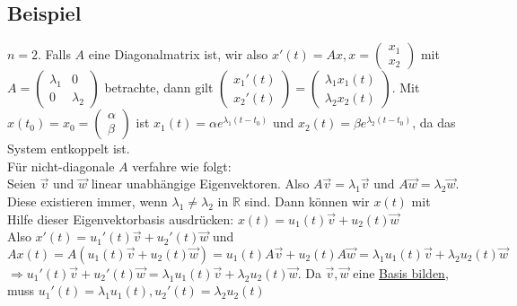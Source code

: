 \documentclass[12pt,a4paper]{article}
\begin{document}
\subsection{Beispiel}
$n=2$. Falls $A$ eine Diagonalmatrix ist, wir also $x'(t) = Ax, x=\begin{pmatrix}
x_1 \\
x_2
\end{pmatrix}$ mit $A=\begin{pmatrix}
\lambda_1 & 0 \\
0 & \lambda_2
\end{pmatrix}$ betrachte, dann gilt $\begin{pmatrix}
x_1'(t) \\
x_2'(t)
\end{pmatrix} = \begin{pmatrix}
\lambda_1x_1(t) \\
\lambda_2x_2(t)
\end{pmatrix}$. Mit $x(t_0) = x_0 = \begin{pmatrix}
\alpha \\
\beta
\end{pmatrix}$ ist $x_1(t) = \alpha e^{\lambda_1(t-t_0)}$ und $x_2(t) = \beta e^{\lambda_2(t-t_0)}$, da das System entkoppelt ist. \\
Für nicht-diagonale $A$ verfahre wie folgt: \\
Seien $\overset{\rightarrow}{v}$ und $\overset{\rightarrow}{w}$ linear unabhängige Eigenvektoren. Also $A\overset{\rightarrow}{v}=\lambda_1\overset{\rightarrow}{v}$ und $A\overset{\rightarrow}{w}=\lambda_2\overset{\rightarrow}{w}$. Diese existieren immer, wenn $\lambda_1 \neq \lambda_2$ in $\mathbb{R}$ sind. Dann können wir $x(t)$ mit Hilfe dieser Eigenvektorbasis ausdrücken: $x(t) = u_1(t) \overset{\rightarrow}{v} + u_2(t) \overset{\rightarrow}{w}$ \\
Also $x'(t) = u_1'(t)\overset{\rightarrow}{v}+u_2'(t)\overset{\rightarrow}{w}$ und $Ax(t) = A(u_1(t) \overset{\rightarrow}{v} + u_2(t) \overset{\rightarrow}{w}) = u_1(t)A\overset{\rightarrow}{v}+u_2(t)A\overset{\rightarrow}{w} = \lambda_1u_1(t)\overset{\rightarrow}{v}+\lambda_2u_2(t)\overset{\rightarrow}{w}$ \\
$\Rightarrow u_1'(t)\overset{\rightarrow}{v} + u_2'(t)\overset{\rightarrow}{w} = \lambda_1u_1(t)\overset{\rightarrow}{v} + \lambda_2u_2(t)\overset{\rightarrow}{w}$. Da $\overset{\rightarrow}{v},\overset{\rightarrow}{w}$ eine \underline{Basis bilden}, muss $u_1'(t) = \lambda_1u_1(t), u_2'(t) = \lambda_2u_2(t)$ \\
\end{document}
